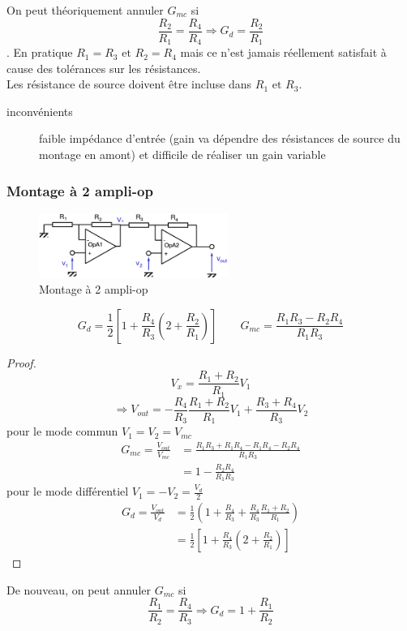 On peut théoriquement annuler \(G_{mc}\) si \[\frac{R_2}{R_1}=\frac{R_4}{R_4}\Rightarrow G_d=\frac{R_2}{R_1}\]. En pratique \(R_1=R_3\text{ et }R_2=R_4\) mais ce n'est jamais réellement satisfait à cause des tolérances sur les résistances.\\
Les résistance de source doivent être incluse dans \(R_1\text{ et }R_3\).
\begin{description}
	\item[inconvénients] faible impédance d'entrée (gain va dépendre des résistances de source du montage en amont) et difficile de réaliser un gain variable
\end{description}
\subsubsection{Montage à 2 ampli-op}
\begin{figure}[H] 
	\centering 
	\includegraphics[width=0.55\textwidth,height=10\baselineskip,keepaspectratio]{ch4/image2} 
	\caption{Montage à 2 ampli-op} 
\end{figure}
\[G_d = \frac{1}{2}\left[1+\frac{R_4}{R_3}\left(2+\frac{R_2}{R_1}\right)\right]\qquad G_{mc} = \frac{R_1R_3-R_2R_4}{R_1R_3}\]
\begin{proof}
	\[V_x = \frac{R_1+R_2}{R_1}V_1\]
	\[\Rightarrow V_{out} = -\frac{R_4}{R_3}\frac{R_1+R_2}{R_1}V_1+\frac{R_3+R_4}{R_3}V_2\]
	pour le mode commun \(V_1=V_2=V_{mc}\)
	\begin{align*}
		G_{mc} = \frac{V_{out}}{V_{mc}} &=\frac{R_1R_3+R_1R_4-R_1R_4-R_2R_4}{R_1R_3}\\
		&= 1-\frac{R_2R_4}{R_1R_3}
	\end{align*}
	pour le mode différentiel \(V_1=-V_2=\frac{V_d}{2}\)
	\begin{align*}
		G_d=\frac{V_{out}}{V_d} &= \frac{1}{2}\left(1+\frac{R_4}{R_3}+\frac{R_4}{R_3}\frac{R_1+R_2}{R_1}\right)\\
		&= \frac{1}{2}\left[1+\frac{R_4}{R_3}\left(2+\frac{R_2}{R_1}\right)\right]
	\end{align*}
\end{proof}
De nouveau, on peut annuler \(G_{mc}\) si 
\[\frac{R_1}{R_2}=\frac{R_4}{R_3}\Rightarrow G_d = 1+\frac{R_1}{R_2}\]
